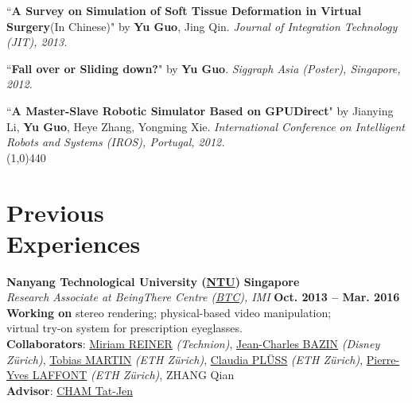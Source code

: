 \documentclass[margin,line]{resume}
\begin{document}
\begin{resume}
    ``\textbf{A Survey on Simulation of Soft Tissue Deformation in Virtual Surgery}(In Chinese)" 
    by \textbf{Yu Guo}, Jing Qin. 
    \textsl{Journal of Integration Technology (JIT), 2013.}\\

    \vspace{-5mm}

    ``\textbf{Fall over or Sliding down?}" 
    by \textbf{Yu Guo}.
    \textsl{Siggraph Asia (Poster), Singapore, 2012.}\\

    \vspace{-5mm}

    ``\textbf{A Master-Slave Robotic Simulator Based on GPUDirect}" 
    by Jianying Li, \textbf{Yu Guo}, Heye Zhang, Yongming Xie.
    \textsl{International Conference on Intelligent Robots and Systems (IROS), Portugal, 2012.}\\


    \vspace{-5.0mm}
    \line(1,0){440}
    \vspace{-5.0mm}

    \section{\mysidestyle Previous \\Experiences}

    \textbf{Nanyang Technological University (\href{http://www.ntu.edu.sg/Pages/home.aspx}{NTU})} \hfill \textbf{Singapore} \\
    \textsl{Research Associate at BeingThere Centre (\href{http://imi.ntu.edu.sg/BeingThereCentre/Pages/BTChome.aspx}{BTC}), IMI} \hfill \textbf{Oct. 2013 -- Mar. 2016}\\
    \textbf{Working on} stereo rendering; physical-based video manipulation; \\virtual try-on system for prescription eyeglasses. \\
    \textbf{Collaborators}:  \href{http://edu.technion.ac.il/haptech/group/miriam_home.html}{Miriam REINER} \textsl{(Technion)},
                    \href{https://graphics.ethz.ch/~jebazin/}{Jean-Charles BAZIN} \textsl{(Disney Z\"{u}rich)},
                    \href{https://graphics.ethz.ch/~martint/}{Tobias MARTIN} \textsl{(ETH Z\"{u}rich)},
                    \href{https://graphics.ethz.ch/~ckuster/}{Claudia PL\"{U}SS} \textsl{(ETH Z\"{u}rich)},
                    \href{https://graphics.ethz.ch/~plaffont/}{Pierre-Yves LAFFONT} \textsl{(ETH Z\"{u}rich)},
                    ZHANG Qian \\
    \textbf{Advisor}:        \href{http://www.ntu.edu.sg/home/astjcham/}{CHAM Tat-Jen}                 
    

\end{resume}
\end{document}
